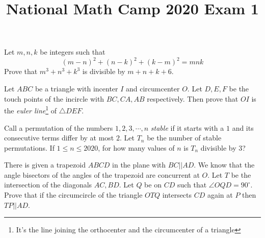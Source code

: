 \documentclass[12pt]{article}
\title{\vspace{-3em}National Math Camp 2020 Exam 1}
\begin{document}
\maketitle
\thispagestyle{empty}
\vspace{2em}

\begin{problem}
    Let $m,n,k$ be integers such that \[(m-n)^2+(n-k)^2+(k-m)^2=mnk\] Prove
    that $m^3+n^3+k^3$ is divisible by $m+n+k+6$.
\end{problem}

\begin{problem}
    Let $ABC$ be a triangle with incenter $I$ and circumcenter $O$. Let
    $D, E, F$ be the touch points of the incircle with $BC, CA, AB$
    respectively. Then prove that $OI$ is the \emph{euler
    line}\footnote{It's the line joining the orthocenter and the
    circumcenter of a triangle} of $\triangle DEF$.
\end{problem}

\begin{problem}
    Call a permutation of the numbers \(1, 2, 3, \cdots , n\) \textit{stable}
    if it starts with a \(1\) and its consecutive terms differ by at most
    \(2\). Let \(T_n\) be the number of stable permutations. If \(1\leq n \leq
    2020\), for how many values of \(n\) is \(T_n\) divisible by \(3\)?
\end{problem}

\begin{problem}
    There is given a trapezoid $ ABCD$ in the plane with $ BC||AD$. We know
    that the angle bisectors of the angles of the trapezoid are concurrent at
    $ O$. Let $ T$ be the intersection of the diagonals $ AC,BD$. Let $ Q$ be on
    $ CD$ such that $ \angle OQD = 90^\circ$.\\
    
    Prove that if the circumcircle of
    the triangle $ OTQ$ intersects $ CD$ again at $ P$ then $ TP||AD$.
\end{problem}
    
\end{document}
